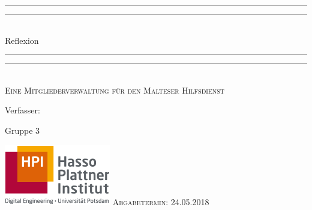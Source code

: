 \documentclass[11pt]{article}
\newlength{\drop}
\begin{document}
  \begin{titlepage}
    \textheight
    \centering
    \vspace*{\baselineskip}
    \rule{\textwidth}{1.6pt}\vspace*{-\baselineskip}\vspace*{2pt}
    \rule{\textwidth}{0.4pt}\\[\baselineskip]
    {\LARGE Reflexion}\\[0.2\baselineskip]
    \rule{\textwidth}{0.4pt}\vspace*{-\baselineskip}\vspace{3.2pt}
    \rule{\textwidth}{1.6pt}\\[\baselineskip]
    \scshape
    Eine Mitgliederverwaltung für den Malteser Hilfsdienst\par
    \vspace*{2\baselineskip}
    Verfasser: \\[\baselineskip]
    {\Large Gruppe 3\par}
    \centering
    \vspace{1cm}
    \includegraphics[width=0.25 \textwidth]{hpi.png}
    \vfill
    {\scshape Abgabetermin: 24.05.2018\\}
  \end{titlepage}
\end{document}
